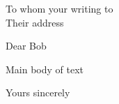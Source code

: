 \documentclass[12pt,dvips]{letter}
\begin{document}
   
   \address
   {
     Name \\
     email @auckand.ac.nz
     Departement of Engineering Science \\
     The University of Auckland \\
   }   
   \begin{letter}
   {
     To whom your writing to \\
     Their address\\
   }
     
   \opening{Dear Bob}

      Main body of text

   \signature{Your name again}
   \closing {Yours sincerely \etc}
   \end{letter}
\end{document}
